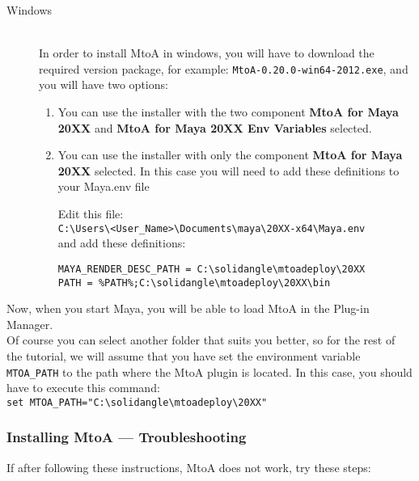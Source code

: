 \begin{description}

\item[Windows] \hfill \\
In order to install MtoA in windows, you will have to download the required version package, for example: \texttt{MtoA-0.20.0-win64-2012.exe}, and you will have two options:
\begin{enumerate}
\item You can use the installer with the two component \textbf{MtoA for Maya 20XX} and \textbf{MtoA for Maya 20XX Env Variables} selected.
\item You can use the installer with only the component \textbf{MtoA for Maya 20XX} selected. In this case you will need to add these definitions to your Maya.env file

Edit this file:\\
\verb|C:\Users\<User_Name>\Documents\maya\20XX-x64\Maya.env|\\
and add these definitions:
{\footnotesize \begin{verbatim}
MAYA_RENDER_DESC_PATH = C:\solidangle\mtoadeploy\20XX
PATH = %PATH%;C:\solidangle\mtoadeploy\20XX\bin
\end{verbatim}}

\end{enumerate}

\end{description}

Now, when you start Maya, you will be able to load MtoA in the Plug-in Manager.\\

Of course you can select another folder that suits you better, so for the rest of the tutorial, we will assume that you have set the environment variable \texttt{MTOA\_PATH} to the path where the MtoA plugin is located. In this case, you should have to execute this command:\\
\verb|set MTOA_PATH="C:\solidangle\mtoadeploy\20XX"|

\subsubsection{Installing MtoA --- Troubleshooting}
If after following these instructions, MtoA does not work, try these steps:

